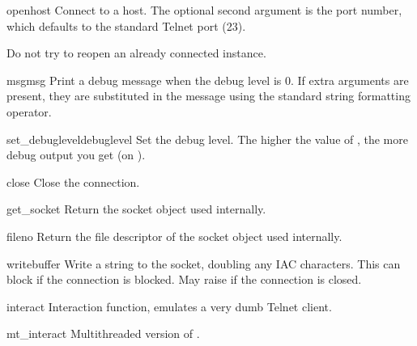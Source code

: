 \begin{methoddesc}{open}{host}
Connect to a host.
The optional second argument is the port number, which
defaults to the standard Telnet port (23).

Do not try to reopen an already connected instance.
\end{methoddesc}

\begin{methoddesc}{msg}{msg}
Print a debug message when the debug level is \code{>} 0.
If extra arguments are present, they are substituted in the
message using the standard string formatting operator.
\end{methoddesc}

\begin{methoddesc}{set_debuglevel}{debuglevel}
Set the debug level.  The higher the value of , the
more debug output you get (on ).
\end{methoddesc}

\begin{methoddesc}{close}{}
Close the connection.
\end{methoddesc}

\begin{methoddesc}{get_socket}{}
Return the socket object used internally.
\end{methoddesc}

\begin{methoddesc}{fileno}{}
Return the file descriptor of the socket object used internally.
\end{methoddesc}

\begin{methoddesc}{write}{buffer}
Write a string to the socket, doubling any IAC characters.
This can block if the connection is blocked.  May raise
 if the connection is closed.
\end{methoddesc}

\begin{methoddesc}{interact}{}
Interaction function, emulates a very dumb Telnet client.
\end{methoddesc}

\begin{methoddesc}{mt_interact}{}
Multithreaded version of .
\end{methoddesc}

